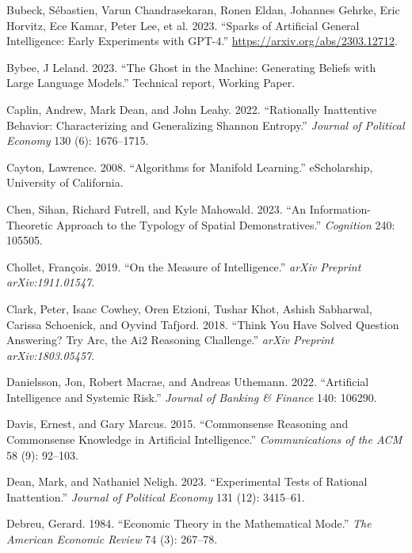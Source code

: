\documentclass[
]{article}
\newlength{\cslhangindent}
\newenvironment{CSLReferences}[2] %
 {\begin{list}{}{%
  \setlength{\itemindent}{0pt}
  \setlength{\leftmargin}{0pt}
  \setlength{\parsep}{0pt}
  \ifodd #1
   \setlength{\leftmargin}{\cslhangindent}
   \setlength{\itemindent}{-1\cslhangindent}
  \fi
  \setlength{\itemsep}{#2\baselineskip}}}
 {\end{list}}
\begin{document}
\begin{CSLReferences}{1}{0}
Bubeck, Sébastien, Varun Chandrasekaran, Ronen Eldan, Johannes Gehrke,
Eric Horvitz, Ece Kamar, Peter Lee, et al. 2023. {``Sparks of Artificial
General Intelligence: Early Experiments with GPT-4.''}
\url{https://arxiv.org/abs/2303.12712}.

Bybee, J Leland. 2023. {``The Ghost in the Machine: Generating Beliefs
with Large Language Models.''} Technical report, Working Paper.

Caplin, Andrew, Mark Dean, and John Leahy. 2022. {``Rationally
Inattentive Behavior: Characterizing and Generalizing Shannon
Entropy.''} \emph{Journal of Political Economy} 130 (6): 1676--1715.

Cayton, Lawrence. 2008. {``Algorithms for Manifold Learning.''}
eScholarship, University of California.

Chen, Sihan, Richard Futrell, and Kyle Mahowald. 2023. {``An
Information-Theoretic Approach to the Typology of Spatial
Demonstratives.''} \emph{Cognition} 240: 105505.

Chollet, François. 2019. {``On the Measure of Intelligence.''}
\emph{arXiv Preprint arXiv:1911.01547}.

Clark, Peter, Isaac Cowhey, Oren Etzioni, Tushar Khot, Ashish Sabharwal,
Carissa Schoenick, and Oyvind Tafjord. 2018. {``Think You Have Solved
Question Answering? Try Arc, the Ai2 Reasoning Challenge.''} \emph{arXiv
Preprint arXiv:1803.05457}.

Danielsson, Jon, Robert Macrae, and Andreas Uthemann. 2022.
{``Artificial Intelligence and Systemic Risk.''} \emph{Journal of
Banking \& Finance} 140: 106290.

Davis, Ernest, and Gary Marcus. 2015. {``Commonsense Reasoning and
Commonsense Knowledge in Artificial Intelligence.''}
\emph{Communications of the ACM} 58 (9): 92--103.

Dean, Mark, and Nathaniel Neligh. 2023. {``Experimental Tests of
Rational Inattention.''} \emph{Journal of Political Economy} 131 (12):
3415--61.

Debreu, Gerard. 1984. {``Economic Theory in the Mathematical Mode.''}
\emph{The American Economic Review} 74 (3): 267--78.


\end{CSLReferences}
\end{document}
